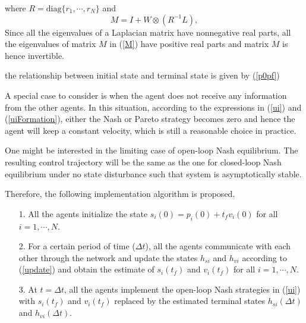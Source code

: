 \documentclass[10pt,doublecolumn]{IEEEtran}  %
\begin{document}
where $R=\mbox{diag}\{r_1,\cdots,r_N\}$ and
\begin{equation}
M=I+W\otimes (R^{-1}L),\label{M}
\end{equation}
Since all the eigenvalues of a Laplacian matrix have nonnegative real parts, all the eigenvalues of matrix $M$ in (\ref{M}) have positive real parts and matrix $M$ is hence invertible.

the relationship between initial state and terminal state is given by (\ref{p0pf})






{A special case to consider is when the agent does not receive any information from the other agents. In this situation, according to the expressions in (\ref{ui}) and (\ref{uiFormation}), either the Nash or Pareto strategy becomes zero and hence the agent will keep a constant velocity, which is still a reasonable choice in practice.}


\begin{Rmk}
One might be interested in the limiting case of open-loop Nash equilibrium. The resulting control trajectory will be the same as the one for closed-loop Nash equilibrium under no state disturbance such that system is asymptotically stable.
\end{Rmk}

Therefore, the following implementation algorithm is proposed.
\begin{Alg}\label{Alg}
\quad
\begin{itemize}
\item[1.] All the agents initialize the state {$s_{i}(0)=p_i(0)+t_fv_i(0)$} for all $i=1,\cdots,N$.
\item[2.] For a certain period of time ($\Delta t$), all the agents communicate with each other through the network and update the states $h_{si}$ and $h_{vi}$ according to (\ref{update}) and obtain the estimate of $s_{i}(t_f)$ and $v_i(t_f)$ for all $i=1,\cdots,N$.
\item[3.] At $t=\Delta t$, all the agents implement the {open-loop Nash} strategies in (\ref{ui}) with $s_i(t_f)$ and $v_i(t_f)$ replaced by the estimated terminal states $h_{si}(\Delta t)$ and $h_{vi}(\Delta t)$.
\end{itemize}
\end{Alg}
\end{document}
